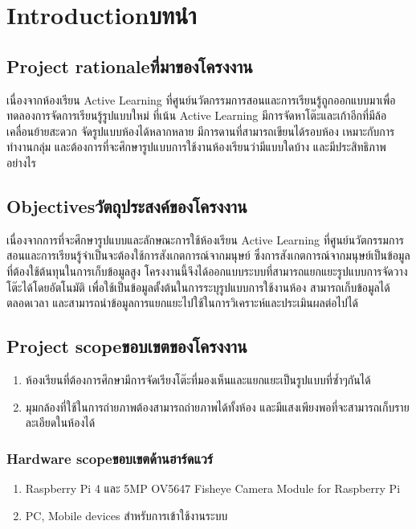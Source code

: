 \chapter{\ifenglish Introduction\else บทนำ\fi}

\section{\ifenglish Project rationale\else ที่มาของโครงงาน\fi}
เนื่องจากห้องเรียน Active Learning ที่ศูนย์นวัตกรรมการสอนและการเรียนรู้ถูกออกแบบมาเพื่อทดลองการจัดการเรียนรู้รูปแบบใหม่
\enskip ที่เน้น Active Learning มีการจัดหาโต๊ะและเก้าอีกที่มีล้อเคลื่อนย้ายสะดวก จัดรูปแบบห้องได้หลากหลาย มีการดานที่สามารถเขียนได้รอบห้อง เหมาะกับการทำงานกลุ่ม
\enskip และต้องการที่จะศึกษารูปแบบการใช้งานห้องเรียนว่ามีแบบใดบ้าง และมีประสิทธิภาพอย่างไร
\section{\ifenglish Objectives\else วัตถุประสงค์ของโครงงาน\fi}
เนื่องจากการที่จะศึกษารูปแบบและลักษณะการใช้ห้องเรียน Active Learning ที่ศูนย์นวัตกรรมการสอนและการเรียนรู้จำเป็นจะต้องใช้การสังเกตการณ์จากมนุษย์
\enskip ซึ่งการสังเกตการณ์จากมนุษย์เป็นข้อมูลที่ต้องใช้ต้นทุนในการเก็บข้อมูลสูง
\enskip โครงงานนี้จึงได้ออกแบบระบบที่สามารถแยกแยะรูปแบบการจัดวางโต๊ะได้โดยอัตโนมัติ เพื่อใช้เป็นข้อมูลตั้งต้นในการระบุรูปแบบการใช้งานห้อง
\enskip สามารถเก็บข้อมูลได้ตลอดเวลา และสามารถนำข้อมูลการแยกแยะไปใช้ในการวิเคราะห์และประเมินผลต่อไปได้

\section{\ifenglish Project scope\else ขอบเขตของโครงงาน\fi}
    \begin{enumerate}
        \item ห้องเรียนที่ต้องการศึกษามีการจัดเรียงโต๊ะที่มองเห็นและแยกแยะเป็นรูปแบบที่ซ้ำๆกันได้
        \item มุมกล้องที่ใช้ในการถ่ายภาพต้องสามารถถ่ายภาพได้ทั้งห้อง 
        \enskip และมีแสงเพียงพอที่จะสามารถเก็บรายละเอียดในห้องได้
    \end{enumerate}
\subsection{\ifenglish Hardware scope\else ขอบเขตด้านฮาร์ดแวร์\fi}
    \begin{enumerate}
        \item Raspberry Pi 4 และ 5MP OV5647 Fisheye Camera Module for Raspberry Pi
        \item PC, Mobile devices สำหรับการเข้าใช้งานระบบ
    \end{enumerate}
